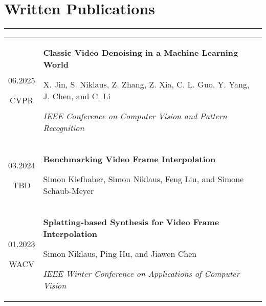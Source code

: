 \documentclass[10pt]{article}
\begin{document}
\section*{Written Publications}
\vspace{-0.3cm}
{\color{E6E6E6} \hrule height 0.04cm}
\vspace{0.4cm}
\renewcommand{\arraystretch}{1.0}
\begin{tabular}{C Z D}
	{
		06.2025
		
		\vspace{-0.05cm}
		
		{\scriptsize CVPR}
	}
	&
	{
		{\bf Classic Video Denoising in a Machine Learning World}
		
		\vspace{0.00cm}
		
		{\scriptsize X. Jin, S. Niklaus, Z. Zhang, Z. Xia, C. L. Guo, Y. Yang, J. Chen, and C. Li}
		
		\vspace{0.05cm}
		
		{\scriptsize \it IEEE Conference on Computer Vision and Pattern Recognition}
		
		\vspace{0.0cm}
	}
	\\
	{
		03.2024
		
		\vspace{-0.05cm}
		
		{\scriptsize TBD}
	}
	&
	{
		{\bf Benchmarking Video Frame Interpolation}
		
		\vspace{0.00cm}
		
		{\scriptsize Simon Kiefhaber, Simon Niklaus, Feng Liu, and Simone Schaub-Meyer}
		
		\vspace{0.0cm}
	}
	\\
	{
		01.2023
		
		\vspace{-0.05cm}
		
		{\scriptsize WACV}
	}
	&
	{
		{\bf Splatting-based Synthesis for Video Frame Interpolation}
		
		\vspace{0.00cm}
		
		{\scriptsize Simon Niklaus, Ping Hu, and Jiawen Chen}
		
		\vspace{0.05cm}
		
		{\scriptsize \it IEEE Winter Conference on Applications of Computer Vision}
		
}
\end{tabular}
\end{document}
